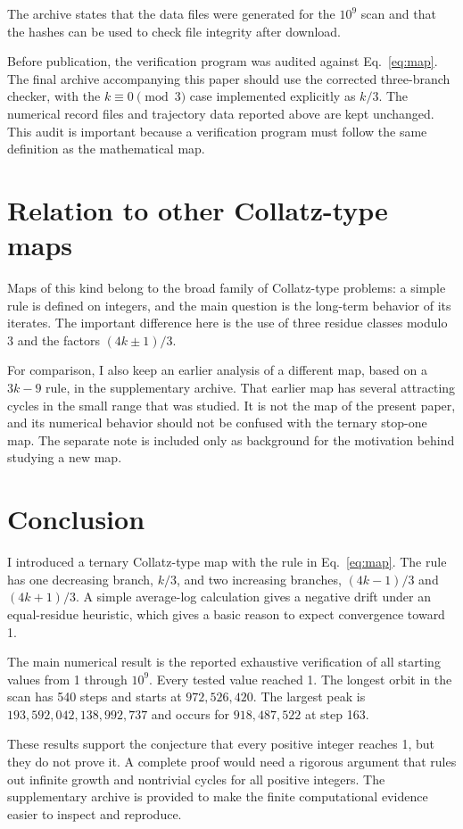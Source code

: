 \documentclass[11pt]{article}
\begin{document}
The archive states that the data files were generated for the $10^9$ scan and that the hashes can be used to check file integrity after download.

Before publication, the verification program was audited against Eq.~\eqref{eq:map}. The final archive accompanying this paper should use the corrected three-branch checker, with the $k\equiv0\pmod3$ case implemented explicitly as $k/3$. The numerical record files and trajectory data reported above are kept unchanged. This audit is important because a verification program must follow the same definition as the mathematical map.

\section{Relation to other Collatz-type maps}
Maps of this kind belong to the broad family of Collatz-type problems: a simple rule is defined on integers, and the main question is the long-term behavior of its iterates. The important difference here is the use of three residue classes modulo 3 and the factors $(4k\pm1)/3$.

For comparison, I also keep an earlier analysis of a different map, based on a $3k-9$ rule, in the supplementary archive. That earlier map has several attracting cycles in the small range that was studied. It is not the map of the present paper, and its numerical behavior should not be confused with the ternary stop-one map. The separate note is included only as background for the motivation behind studying a new map.

\section{Conclusion}
I introduced a ternary Collatz-type map with the rule in Eq.~\eqref{eq:map}. The rule has one decreasing branch, $k/3$, and two increasing branches, $(4k-1)/3$ and $(4k+1)/3$. A simple average-log calculation gives a negative drift under an equal-residue heuristic, which gives a basic reason to expect convergence toward 1.

The main numerical result is the reported exhaustive verification of all starting values from 1 through $10^9$. Every tested value reached 1. The longest orbit in the scan has 540 steps and starts at $972,526,420$. The largest peak is $193,592,042,138,992,737$ and occurs for $918,487,522$ at step 163.

These results support the conjecture that every positive integer reaches 1, but they do not prove it. A complete proof would need a rigorous argument that rules out infinite growth and nontrivial cycles for all positive integers. The supplementary archive is provided to make the finite computational evidence easier to inspect and reproduce.
\end{document}
